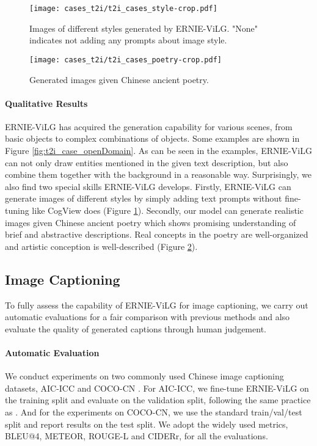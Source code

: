 \documentclass{article}
\begin{document}
\begin{figure}[htb]
    \centering
    \texttt{[image: cases\_t2i/t2i\_cases\_style-crop.pdf]}
    \caption{Images of different styles generated by ERNIE-ViLG. "None" indicates not adding any prompts about image style.}
    \label{fig:t2i_case_style}
\end{figure}
\begin{figure}[htb]
    \centering
    \texttt{[image: cases\_t2i/t2i\_cases\_poetry-crop.pdf]}
    \caption{Generated images given Chinese ancient poetry.}
    \label{fig:t2i_case_poetry}
\end{figure}

\paragraph{Qualitative Results}
ERNIE-ViLG has acquired the generation capability for various scenes, from basic objects to complex combinations of objects. 
Some examples are shown in Figure \ref{fig:t2i_case_openDomain}. As can be seen in the examples, ERNIE-ViLG can not only draw entities mentioned in the given text description, but also combine them together with the background in a reasonable way. Surprisingly, we also find two special skills ERNIE-ViLG develops. Firstly, ERNIE-ViLG can generate images of different styles by simply adding text prompts without fine-tuning like CogView does (Figure \ref{fig:t2i_case_style}). Secondly, our model can generate realistic images given Chinese ancient poetry which shows 
promising understanding of brief and abstractive descriptions. Real concepts in the poetry are well-organized and artistic conception is well-described (Figure \ref{fig:t2i_case_poetry}).

\subsection{Image Captioning}
To fully assess the capability of ERNIE-ViLG for image captioning, we carry out automatic evaluations for a fair comparison with previous methods and also evaluate the quality of generated captions through human judgement. 

\paragraph{Automatic Evaluation}
We conduct experiments on two commonly used Chinese image captioning datasets, AIC-ICC \cite{wu2017aicicc} and COCO-CN \cite{li2019cococn}. For AIC-ICC, we fine-tune ERNIE-ViLG on the training split and evaluate on the validation split, following the same practice as \cite{huo2021wenlan}. And for the experiments on COCO-CN, we use the standard train/val/test split and report results on the test split. We adopt the widely used metrics, BLEU@4, METEOR, ROUGE-L and CIDERr, for all the evaluations.
\end{document}
